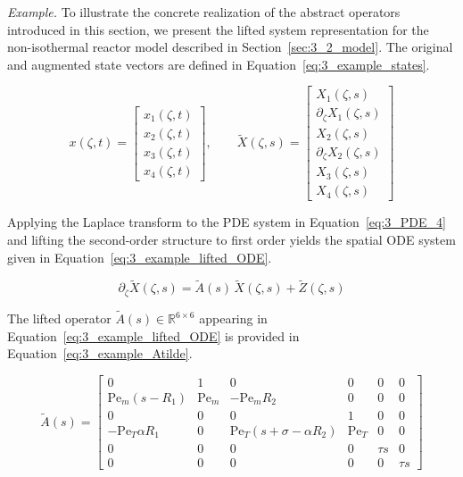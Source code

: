 \noindent\textit{Example.} To illustrate the concrete realization of the abstract operators introduced in this section, we present the lifted system representation for the non-isothermal reactor model described in Section~\ref{sec:3_2_model}. The original and augmented state vectors are defined in Equation~\eqref{eq:3_example_states}.

\begin{equation} \label{eq:3_example_states}
x(\zeta, t) =
\begin{bmatrix}
x_1(\zeta, t) \\
x_2(\zeta, t) \\
x_3(\zeta, t) \\
x_4(\zeta, t)
\end{bmatrix}, \qquad
\tilde{X}(\zeta, s) =
\begin{bmatrix}
X_1(\zeta, s) \\
\partial_\zeta X_1(\zeta, s) \\
X_2(\zeta, s) \\
\partial_\zeta X_2(\zeta, s) \\
X_3(\zeta, s) \\
X_4(\zeta, s)
\end{bmatrix}
\end{equation}

Applying the Laplace transform to the PDE system in Equation~\eqref{eq:3_PDE_4} and lifting the second-order structure to first order yields the spatial ODE system given in Equation~\eqref{eq:3_example_lifted_ODE}.

\begin{equation} \label{eq:3_example_lifted_ODE}
\partial_\zeta \tilde{X}(\zeta, s) = \tilde{A}(s)\, \tilde{X}(\zeta, s) + \tilde{Z}(\zeta, s)
\end{equation}

The lifted operator $\tilde{A}(s) \in \mathbb{R}^{6 \times 6}$ appearing in Equation~\eqref{eq:3_example_lifted_ODE} is provided in Equation~\eqref{eq:3_example_Atilde}.

\begin{equation} \label{eq:3_example_Atilde}
\tilde{A}(s) =
\begin{bmatrix}
0 & 1 & 0 & 0 & 0 & 0 \\
\mathrm{Pe}_m(s - R_1) & \mathrm{Pe}_m & -\mathrm{Pe}_m R_2 & 0 & 0 & 0 \\
0 & 0 & 0 & 1 & 0 & 0 \\
-\mathrm{Pe}_T \alpha R_1 & 0 & \mathrm{Pe}_T(s + \sigma - \alpha R_2) & \mathrm{Pe}_T & 0 & 0 \\
0 & 0 & 0 & 0 & \tau s & 0 \\
0 & 0 & 0 & 0 & 0 & \tau s
\end{bmatrix}
\end{equation}

